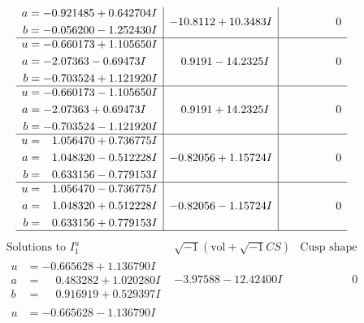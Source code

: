 \documentclass[1p]{elsarticle_modified}
\theoremstyle{definition}
\newcommand{\I}{\sqrt{-1}}
\begin{document}
$$\begin{array}{c|c|c}
\begin{aligned}
a &= -0.921485 + 0.642704 I \\
b &= -0.056200 - 1.252430 I\end{aligned}
 & -10.8112 + 10.3483 I & \phantom{-0.000000 } 0 \\ \hline\begin{aligned}
u &= -0.660173 + 1.105650 I \\
a &= -2.07363 - 0.69473 I \\
b &= -0.703524 + 1.121920 I\end{aligned}
 & \phantom{-}0.9191 - 14.2325 I & \phantom{-0.000000 } 0 \\ \hline\begin{aligned}
u &= -0.660173 - 1.105650 I \\
a &= -2.07363 + 0.69473 I \\
b &= -0.703524 - 1.121920 I\end{aligned}
 & \phantom{-}0.9191 + 14.2325 I & \phantom{-0.000000 } 0 \\ \hline\begin{aligned}
u &= \phantom{-}1.056470 + 0.736775 I \\
a &= \phantom{-}1.048320 - 0.512228 I \\
b &= \phantom{-}0.633156 - 0.779153 I\end{aligned}
 & -0.82056 + 1.15724 I & \phantom{-0.000000 } 0 \\ \hline\begin{aligned}
u &= \phantom{-}1.056470 - 0.736775 I \\
a &= \phantom{-}1.048320 + 0.512228 I \\
b &= \phantom{-}0.633156 + 0.779153 I\end{aligned}
 & -0.82056 - 1.15724 I & \phantom{-0.000000 } 0\\
 \hline 
 \end{array}$$\newpage$$\begin{array}{c|c|c}  
\text{Solutions to }I^u_{1}& \I (\text{vol} + \sqrt{-1}CS) & \text{Cusp shape}\\
 \hline 
\begin{aligned}
u &= -0.665628 + 1.136790 I \\
a &= \phantom{-}0.483282 + 1.020280 I \\
b &= \phantom{-}0.916919 + 0.529397 I\end{aligned}
 & -3.97588 - 12.42400 I & \phantom{-0.000000 } 0 \\ \hline\begin{aligned}
u &= -0.665628 - 1.136790 I \\

\end{aligned}
\end{array}$$
\end{document}
